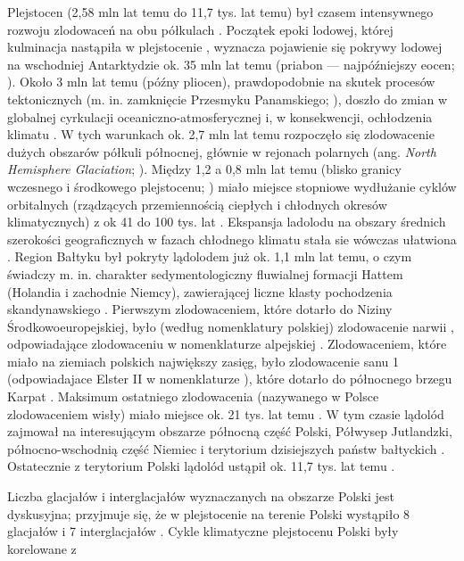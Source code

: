 \documentclass[11.5pt,twoside]{report}
\newcommand{\ct}[1]{\ignorespaces} %
\begin{document}
Plejstocen (2,58 mln lat temu do 11,7 tys. lat temu) był czasem intensywnego rozwoju zlodowaceń na obu półkulach \parencite{Ehlers.2007}. Początek epoki lodowej, której kulminacja nastąpiła w plejstocenie \parencite{Ehlers.2007}, wyznacza pojawienie się pokrywy lodowej na wschodniej Antarktydzie ok. 35 mln lat temu (priabon --- najpó\'{z}niejszy eocen; \cite{Ehlers.2007}). Około 3 mln lat temu (pó\'{z}ny pliocen), prawdopodobnie na skutek procesów tektonicznych (m. in. zamknięcie Przesmyku Panamskiego; \cite{Driscoll.1998,Lisiecki.2007}), doszło do zmian w globalnej cyrkulacji oceaniczno-atmosferycznej \parencite{Filippelli.2009} i, w konsekwencji, ochłodzenia klimatu \ct{zrodlo}. W tych warunkach ok. 2,7 mln lat temu rozpoczęło się zlodowacenie dużych obszarów półkuli północnej, głównie w rejonach polarnych \ct{??} (ang. \textit{North Hemisphere Glaciation}; \cite{Lisiecki.2007}). Między 1,2 a 0,8 mln lat temu (blisko granicy wczesnego i środkowego plejstocenu; \cite{Head.2008}) miało miejsce stopniowe wydłużanie cyklów orbitalnych (rządzących przemiennością ciepłych i chłodnych okresów klimatycznych) z ok 41 do 100 tys. lat \parencite{Ehlers.2007,Lisiecki.2007,Head.2008}. Ekspansja ladolodu na obszary średnich szerokości geograficznych w fazach chłodnego klimatu stała sie wówczas ułatwiona \parencite{Ehlers.2007}. Region Bałtyku był pokryty lądolodem już ok. 1,1 mln lat temu, o czym świadczy m. in. charakter sedymentologiczny fluwialnej formacji Hattem (Holandia i zachodnie Niemcy), zawierającej liczne klasty pochodzenia skandynawskiego \parencite{Lee.2012}. Pierwszym zlodowaceniem, które dotarło do Niziny Środkowoeuropejskiej, było (według nomenklatury polskiej) zlodowacenie narwii \parencite{Lindner.1994} \ct{, ok. ???}, odpowiadające zlodowaceniu \ct{G\"{u}nz (Elbe???)} w nomenklaturze alpejskiej \ct{(zrodlo)}. Zlodowaceniem, które miało na ziemiach polskich największy zasięg, było zlodowacenie sanu 1 (odpowiadajace Elster II w nomenklaturze \ct{??zachodnioeuropejskiej}), które dotarło do północnego brzegu Karpat \parencite{Lindner.2001}. Maksimum ostatniego zlodowacenia (nazywanego w Polsce zlodowaceniem wisły) miało miejsce ok. 21 tys. lat temu \ct{(zrodlo)}. W tym czasie lądolód zajmował na interesującym obszarze północną część Polski, Półwysep Jutlandzki, północno-wschodnią część Niemiec i terytorium dzisiejszych państw bałtyckich \ct{(zrodlo)}. Ostatecznie z terytorium Polski lądolód ustąpił ok. 11,7 tys. lat temu \ct{(zrodlo)}.

Liczba glacjałów i interglacjałów wyznaczanych na obszarze Polski jest dyskusyjna; przyjmuje się, że w plejstocenie na terenie Polski wystąpiło 8 glacjałów i 7 interglacjałów \parencite{Lindner.1994}. Cykle klimatyczne plejstocenu Polski były korelowane z   
\end{document}
